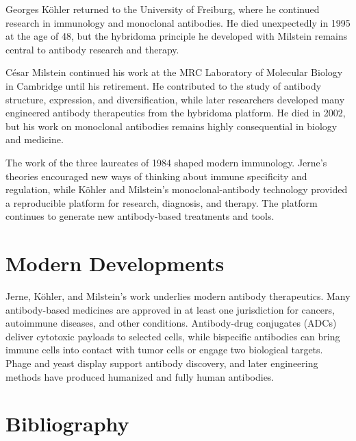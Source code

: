 Georges K\"ohler returned to the University of Freiburg, where he continued research in immunology and monoclonal antibodies. He died unexpectedly in 1995 at the age of 48, but the hybridoma principle he developed with Milstein remains central to antibody research and therapy.

C\'esar Milstein continued his work at the MRC Laboratory of Molecular Biology in Cambridge until his retirement. He contributed to the study of antibody structure, expression, and diversification, while later researchers developed many engineered antibody therapeutics from the hybridoma platform. He died in 2002, but his work on monoclonal antibodies remains highly consequential in biology and medicine.

The work of the three laureates of 1984 shaped modern immunology. Jerne's theories encouraged new ways of thinking about immune specificity and regulation, while K\"ohler and Milstein's monoclonal-antibody technology provided a reproducible platform for research, diagnosis, and therapy. The platform continues to generate new antibody-based treatments and tools.


\section{Modern Developments}

Jerne, K\"ohler, and Milstein's work underlies modern antibody therapeutics. Many antibody-based medicines are approved in at least one jurisdiction for cancers, autoimmune diseases, and other conditions. Antibody-drug conjugates (ADCs) deliver cytotoxic payloads to selected cells, while bispecific antibodies can bring immune cells into contact with tumor cells or engage two biological targets. Phage and yeast display support antibody discovery, and later engineering methods have produced humanized and fully human antibodies.


\section{Bibliography}


